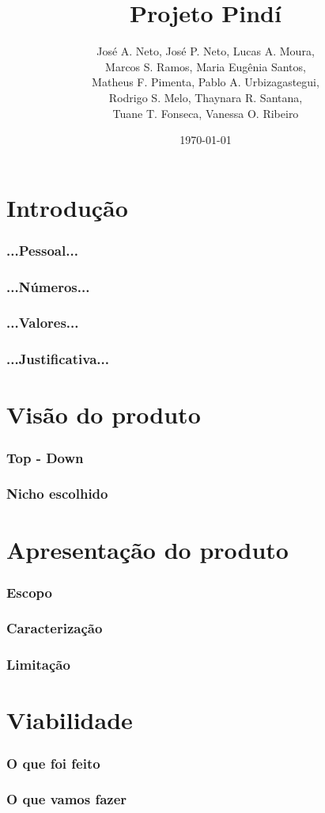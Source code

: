 \documentclass{beamer}
\title{Projeto Pindí}
\author{José A. Neto, José P. Neto, Lucas A. Moura, \\
        Marcos S. Ramos, Maria Eugênia Santos,\\
        Matheus F. Pimenta, Pablo A. Urbizagastegui,\\
        Rodrigo S. Melo, Thaynara R. Santana, \\
        Tuane T. Fonseca, Vanessa O. Ribeiro}
\date{\today}
\institute{\textbf{Universidade de Brasília - Faculdade do Gama}}
\begin{document}
\begin{frame}
  \titlepage
\end{frame}
  
\section{Introdução}
\begin{frame}
  \frametitle{...Pessoal...}
\end{frame}

\begin{frame}
  \frametitle{...Números...}
\end{frame}

\begin{frame}
 \frametitle{...Valores...}
 
\end{frame}

\begin{frame}
 \frametitle{...Justificativa...}
 
\end{frame}

\section{Visão do produto}
\begin{frame}
  \frametitle{Top - Down}
\end{frame}

\begin{frame}
  \frametitle{Nicho escolhido}
\end{frame}

\section{Apresentação do produto}
\begin{frame}
  \frametitle{Escopo}
\end{frame}

\begin{frame}
  \frametitle{Caracterização}
\end{frame}

\begin{frame}
  \frametitle{Limitação}
\end{frame}

\section{Viabilidade}
\begin{frame}
  \frametitle{O que foi feito}
\end{frame}

\begin{frame}
  \frametitle{O que vamos fazer}
\end{frame}
\end{document}
